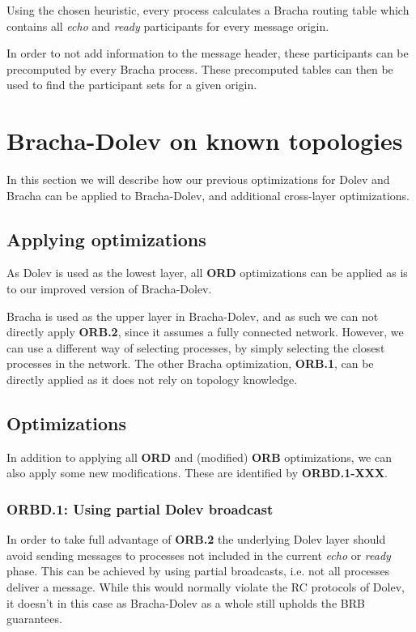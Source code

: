Using the chosen heuristic, every process calculates a Bracha routing table which contains all \textit{echo} and \textit{ready} participants for every message origin.

In order to not add information to the message header, these participants can be precomputed by every Bracha process. These precomputed tables can then be used to find the participant sets for a given origin.

\section{Bracha-Dolev on known topologies}
\label{contr-bracha-dolev}
In this section we will describe how our previous optimizations for Dolev and Bracha can be applied to Bracha-Dolev, and additional cross-layer optimizations.

\subsection{Applying optimizations}
As Dolev is used as the lowest layer, all \textbf{ORD} optimizations can be applied as is to our improved version of Bracha-Dolev.

Bracha is used as the upper layer in Bracha-Dolev, and as such we can not directly apply \textbf{ORB.2}, since it assumes a fully connected network. However, we can use a different way of selecting processes, by simply selecting the closest processes in the network.
The other Bracha optimization, \textbf{ORB.1}, can be directly applied as it does not rely on topology knowledge.

\subsection{Optimizations}
In addition to applying all \textbf{ORD} and (modified) \textbf{ORB} optimizations, we can also apply some new modifications. These are identified by \textbf{ORBD.1-XXX}.

\subsubsection{ORBD.1: Using partial Dolev broadcast}
In order to take full advantage of \textbf{ORB.2} the underlying Dolev layer should avoid sending messages to processes not included in the current \textit{echo} or \textit{ready} phase. This can be achieved by using partial broadcasts, i.e. not all processes deliver a message. While this would normally violate the RC protocols of Dolev, it doesn't in this case as Bracha-Dolev as a whole still upholds the BRB guarantees.

